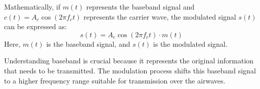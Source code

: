 Mathematically, if \( m(t) \) represents the baseband signal and \( c(t) = A_c \cos(2\pi f_c t) \) represents the carrier wave, the modulated signal \( s(t) \) can be expressed as:
\[ s(t) = A_c \cos(2\pi f_c t) \cdot m(t) \]
Here, \( m(t) \) is the baseband signal, and \( s(t) \) is the modulated signal.

Understanding baseband is crucial because it represents the original information that needs to be transmitted. The modulation process shifts this baseband signal to a higher frequency range suitable for transmission over the airwaves.

